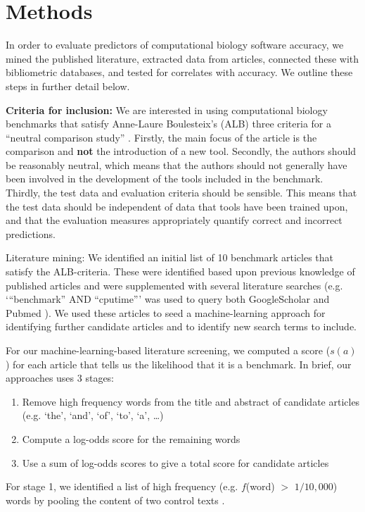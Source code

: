 \documentclass[fleqn,10pt]{SelfArx} %
\begin{document}
\section*{Methods}
In order to evaluate predictors of computational biology software
accuracy, we mined the published literature, extracted data from
articles, connected these with bibliometric databases, and tested for
correlates with accuracy. We outline these steps in further detail
below.

\textbf{Criteria for inclusion:} We are interested in using
computational biology benchmarks that satisfy Anne-Laure Boulesteix’s
(ALB) three criteria for a “neutral comparison study”
\cite{Boulesteix2013-vb}. Firstly, the main focus of the article is
the comparison and \textbf{not} the introduction of a new
tool. Secondly, the authors should be reasonably neutral, which means
that the authors should not generally have been involved in the
development of the tools included in the benchmark. Thirdly, the test
data and evaluation criteria should be sensible. This means that the
test data should be independent of data that tools have been trained
upon, and that the evaluation measures appropriately quantify correct
and incorrect predictions.

Literature mining: We identified an initial list of 10 benchmark
articles that satisfy the ALB-criteria. These were identified based
upon previous knowledge of published articles and were supplemented
with several literature searches (e.g. ‘“benchmark” AND “cputime”’ was
used to query both GoogleScholar and Pubmed
\cite{Sayers2010-vm,McEntyre2001-fl}). We used these articles to seed
a machine-learning approach for identifying further candidate articles
and to identify new search terms to include.

For our machine-learning-based literature screening, we computed a
score ($s(a)$) for each article that tells us the likelihood that it
is a benchmark. In brief, our approaches uses 3 stages:
\begin{enumerate}
\item Remove high frequency words from the title and abstract of candidate articles (e.g. ‘the’, ‘and’, ‘of’, ‘to’, ‘a’, …) 
\item Compute a log-odds score for the remaining words 
\item Use a sum of log-odds scores to give a total score for candidate articles
\end{enumerate}
For stage 1, we identified a list of high frequency (e.g. $f$(word) $>$
$1/10,000$) words by pooling the content of two control texts
\cite{Carroll1865-hk,Tolkien1937-ke}.
\end{document}
